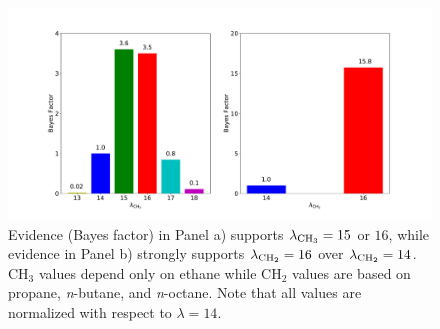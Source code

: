 \documentclass[preprint,letterpaper,floatfix,citeautoscript,aip,jcp]{revtex4-1}
\begin{document}

\begin{figure}[htb!]
	\centering
	\includegraphics[width=4.8in]{Evidence_Mie_CH3_CH2}
	\caption{Evidence (Bayes factor) in Panel a) supports $\lambda_{\rm CH_3} =15 $ or $16$, while evidence in Panel b) strongly supports $\lambda_{\rm CH_2} = 16$ over $\lambda_{\rm CH_2} = 14$. CH$_3$ values depend only on ethane while CH$_2$ values are based on propane, \textit{n}-butane, and \textit{n}-octane. Note that all values are normalized with respect to $\lambda = 14$.}
	\label{fig:Bayes_Factors}
\end{figure}

\end{document}

